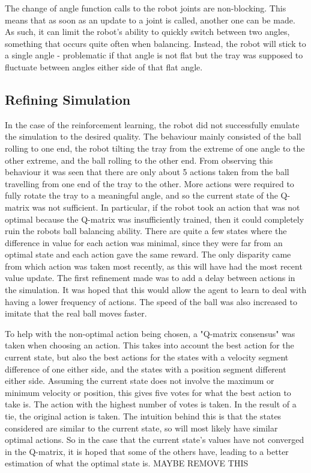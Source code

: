 \documentclass[12pt,a4paper]{article}
\begin{document}
The change of angle function calls to the robot joints are non-blocking. This means that as soon as an update to a joint is called, another one can be made. As such, it can limit the robot's ability to quickly switch between two angles, something that occurs quite often when balancing. Instead, the robot will stick to a single angle - problematic if that angle is not flat but the tray was supposed to fluctuate between angles either side of that flat angle. 

\subsection{Refining Simulation}
In the case of the reinforcement learning, the robot did not successfully emulate the simulation to the desired quality. The behaviour mainly consisted of the ball rolling to one end, the robot tilting the tray from the extreme of one angle to the other extreme, and the ball rolling to the other end. From observing this behaviour it was seen that there are only about 5 actions taken from the ball travelling from one end of the tray to the other. More actions were required to fully rotate the tray to a meaningful angle, and so the current state of the Q-matrix was not sufficient. In particular, if the robot took an action that was not optimal because the Q-matrix was insufficiently trained, then it could completely ruin the robots ball balancing ability. There are quite a few states where the difference in value for each action was minimal, since they were far from an optimal state and each action gave the same reward. The only disparity came from which action was taken most recently, as this will have had the most recent value update. The first refinement made was to add a delay between actions in the simulation. It was hoped that this would allow the agent to learn to deal with having a lower frequency of actions. The speed of the ball was also increased to imitate that the real ball moves faster.

To help with the non-optimal action being chosen, a "Q-matrix consensus" was taken when choosing an action. This takes into account the best action for the current state, but also the best actions for the states with a velocity segment difference of one either side, and the states with a position segment different either side. Assuming the current state does not involve the maximum or minimum velocity or position, this gives five votes for what the best action to take is. The action with the highest number of votes is taken. In the result of a tie, the original action is taken. The intuition behind this is that the states considered are similar to the current state, so will most likely have similar optimal actions. So in the case that the current state's values have not converged in the Q-matrix, it is hoped that some of the others have, leading to a better estimation of what the optimal state is. MAYBE REMOVE THIS
\end{document}
